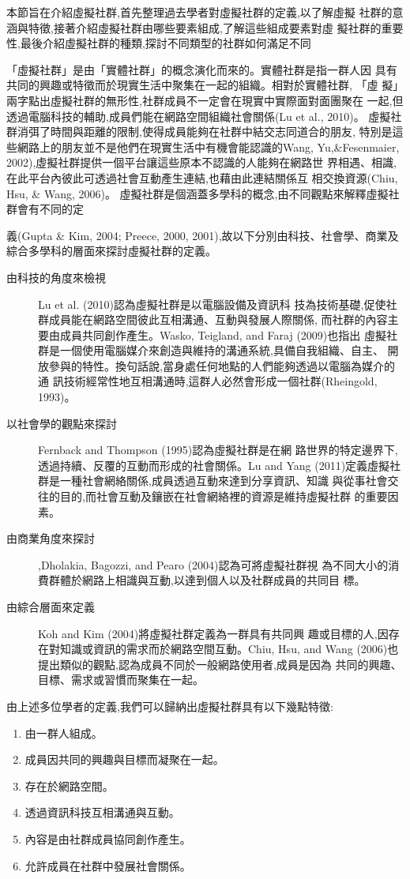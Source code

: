 


本節旨在介紹虛擬社群,首先整理過去學者對虛擬社群的定義,以了解虛擬
社群的意涵與特徵,接著介紹虛擬社群由哪些要素組成,了解這些組成要素對虛
擬社群的重要性,最後介紹虛擬社群的種類,探討不同類型的社群如何滿足不同


「虛擬社群」是由「實體社群」的概念演化而來的。實體社群是指一群人因
具有共同的興趣或特徵而於現實生活中聚集在一起的組織。相對於實體社群,
「虛
擬」兩字點出虛擬社群的無形性,社群成員不一定會在現實中實際面對面團聚在
一起,但透過電腦科技的輔助,成員們能在網路空間組織社會關係(Lu et al., 2010)。
虛擬社群消弭了時間與距離的限制,使得成員能夠在社群中結交志同道合的朋友,
特別是這些網路上的朋友並不是他們在現實生活中有機會能認識的Wang, Yu,\&Fesenmaier, 2002),虛擬社群提供一個平台讓這些原本不認識的人能夠在網路世
界相遇、相識,在此平台內彼此可透過社會互動產生連結,也藉由此連結關係互
相交換資源(Chiu, Hsu, \& Wang, 2006)。
虛擬社群是個涵蓋多學科的概念,由不同觀點來解釋虛擬社群會有不同的定


義(Gupta \& Kim, 2004; Preece, 2000, 2001),故以下分別由科技、社會學、商業及
綜合多學科的層面來探討虛擬社群的定義。

\begin{description}
\item[由科技的角度來檢視] Lu et al. (2010)認為虛擬社群是以電腦設備及資訊科
技為技術基礎,促使社群成員能在網路空間彼此互相溝通、互動與發展人際關係,
而社群的內容主要由成員共同創作產生。Wasko, Teigland, and Faraj (2009)也指出
虛擬社群是一個使用電腦媒介來創造與維持的溝通系統,具備自我組織、自主、
開放參與的特性。換句話說,當身處任何地點的人們能夠透過以電腦為媒介的通
訊技術經常性地互相溝通時,這群人必然會形成一個社群(Rheingold, 1993)。
\item[以社會學的觀點來探討] Fernback and Thompson (1995)認為虛擬社群是在網
路世界的特定邊界下,透過持續、反覆的互動而形成的社會關係。Lu and Yang
(2011)定義虛擬社群是一種社會網絡關係,成員透過互動來達到分享資訊、知識
與從事社會交往的目的,而社會互動及鑲嵌在社會網絡裡的資源是維持虛擬社群
的重要因素。
\item[由商業角度來探討] ,Dholakia, Bagozzi, and Pearo (2004)認為可將虛擬社群視
為不同大小的消費群體於網路上相識與互動,以達到個人以及社群成員的共同目
標。
\item[由綜合層面來定義] Koh and Kim (2004)將虛擬社群定義為一群具有共同興
趣或目標的人,因存在對知識或資訊的需求而於網路空間互動。Chiu, Hsu, and
Wang (2006)也提出類似的觀點,認為成員不同於一般網路使用者,成員是因為
共同的興趣、目標、需求或習慣而聚集在一起。

\end{description}

由上述多位學者的定義,我們可以歸納出虛擬社群具有以下幾點特徵:
\begin{enumerate}
\item 由一群人組成。
\item 成員因共同的興趣與目標而凝聚在一起。
\item 存在於網路空間。
\item 透過資訊科技互相溝通與互動。
\item 內容是由社群成員協同創作產生。
\item 允許成員在社群中發展社會關係。
\end{enumerate}



\EndChapter
